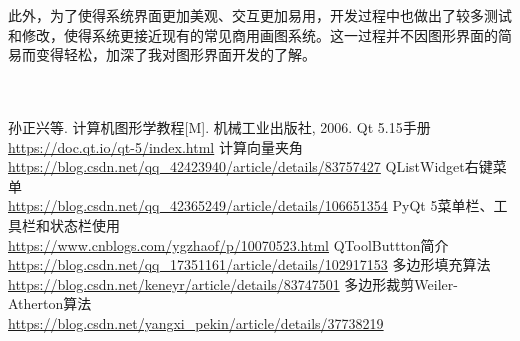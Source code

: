 \documentclass[a4paper,UTF8]{article}
\begin{document}
此外，为了使得系统界面更加美观、交互更加易用，开发过程中也做出了较多测试和修改，使得系统更接近现有的常见商用画图系统。这一过程并不因图形界面的简易而变得轻松，加深了我对图形界面开发的了解。
\\\\\\




\begin{thebibliography}{99}
 孙正兴等. 计算机图形学教程[M]. 机械工业出版社, 2006.
 Qt 5.15手册\\\url{https://doc.qt.io/qt-5/index.html}
 计算向量夹角\\\url{https://blog.csdn.net/qq_42423940/article/details/83757427}
 QListWidget右键菜单\\\url{https://blog.csdn.net/qq_42365249/article/details/106651354}
 PyQt 5菜单栏、工具栏和状态栏使用\\\url{https://www.cnblogs.com/ygzhaof/p/10070523.html}
 QToolButtton简介\\\url{https://blog.csdn.net/qq_17351161/article/details/102917153}
 多边形填充算法\\\url{https://blog.csdn.net/keneyr/article/details/83747501}
 多边形裁剪Weiler-Atherton算法\\\url{https://blog.csdn.net/yangxi_pekin/article/details/37738219} 
\end{thebibliography}
\end{document}
